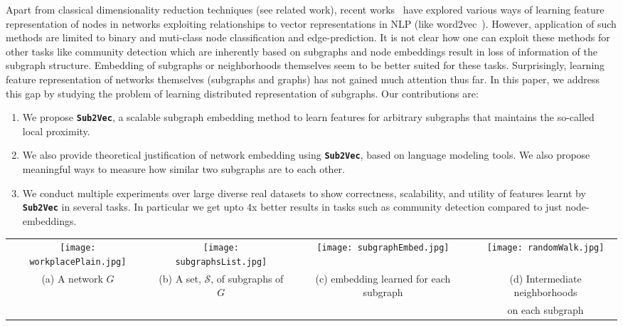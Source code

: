 \documentclass[sigconf]{acmart}
\newcommand{\alg}{{\bf {\tt Sub2Vec}}\xspace}
\newcommand{\s}{\mathcal{S}}
\begin{document}
Apart from classical dimensionality reduction techniques (see related work), recent works~\cite{perozzi2014deepwalk, grover2016node2vec, wang2016structural, tang2015line} have explored various ways of learning feature representation of nodes in networks exploiting relationships to vector representations in NLP (like word2vec~\cite{mikolov2013distributed}). However, application of such methods are limited to binary and muti-class node classification and edge-prediction. It is not clear how one can exploit these methods for other tasks like community detection which are inherently based on subgraphs and node embeddings result in loss of information of the subgraph structure. Embedding of subgraphs or neighborhoods themselves seem to be better suited for these tasks. Surprisingly, learning feature representation of networks themselves (subgraphs and graphs) has not gained much attention thus far. In this paper, we address this gap by  studying the problem of learning distributed representation of subgraphs.  
Our contributions are:
\begin{enumerate}
\item We propose \alg, a scalable subgraph embedding method to learn features for arbitrary subgraphs that maintains the so-called local proximity.

\item We also provide theoretical justification of network embedding using \alg, based on language modeling tools. We also propose meaningful ways to measure how similar two subgraphs are to each other.

\item We conduct multiple experiments over large diverse real datasets to show correctness, scalability, and utility of features learnt by \alg in several tasks. In particular we get upto 4x better results in tasks such as community detection compared to just node-embeddings. 

\end{enumerate}

\begin{figure*}[htb]
\begin{center}

\begin{tabular}{ccc|c}
		\texttt{[image: workplacePlain.jpg]} &
       \texttt{[image: subgraphsList.jpg]} &
       \texttt{[image: subgraphEmbed.jpg]} &
       \texttt{[image: randomWalk.jpg]} \\
      (a) A network $G$   & (b) A set, $\s$, of subgraphs of $G$  & (c) embedding learned for each subgraph  & (d)  Intermediate neighborhoods\\
      & & &  on each subgraph
    \end{tabular}
\end{center}
\caption{\textbf{An overview of our \alg. Our input  is a set of subgraphs $\s$ drawn from a network $G$. We obtain $d$ dimensional embedding of subgraphs such that we maximize the likelihood of observing intermediate neighborhoods. }}
\label{fig:intro}
\end{figure*}
 
\end{document}
